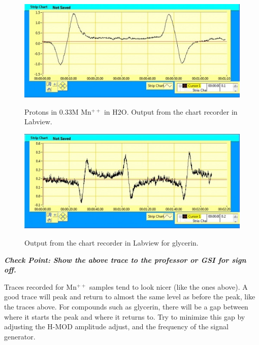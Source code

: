 \documentclass{../lab}
\begin{document}
\begin{figure}[h]
\begin{minipage}{0.49\textwidth}
    \href{http://experimentationlab.berkeley.edu/sites/default/files/images/500px-0_33MMnchart.jpg}{\includegraphics[width=\linewidth,keepaspectratio]{images/500px-0_33MMnchart.jpg}}
    \caption{Protons in 0.33M Mn$^{++}$ in H2O. Output from the chart recorder in Labview.}
    \label{fig:OutputFor33Molar}
\end{minipage}\hfill
\begin{minipage}{0.49\textwidth}
    \href{http://experimentationlab.berkeley.edu/sites/default/files/images/500px-Glycerinchart.jpg}{\includegraphics[width=\linewidth,keepaspectratio]{images/500px-Glycerinchart.jpg}}
    \caption{Output from the chart recorder in Labview for glycerin.}
    \label{fig:OutputForGlycerin}
\end{minipage}
\end{figure}

\emph{\textbf{Check Point: Show the above trace to the professor or GSI for sign off.}}

Traces recorded for Mn$^{++}$ samples tend to look nicer (like the ones above). A good trace will peak and return to almost the same level as before the peak, like the traces above. For compounds such as glycerin, there will be a gap between where it starts the peak and where it returns to. Try to minimize this gap by adjusting the H-MOD amplitude adjust, and the frequency of the signal generator.
\end{document}
